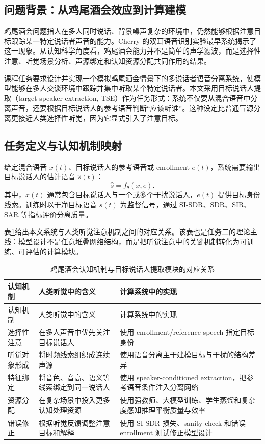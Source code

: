 \documentclass[UTF8,zihao=-4,a4paper]{ctexart}
\begin{document}
\subsection{问题背景：从鸡尾酒会效应到计算建模}

鸡尾酒会问题指人在多人同时说话、背景噪声复杂的环境中，仍然能够根据注意目标跟踪某一特定说话者声音的能力。Cherry 的双耳语音识别实验最早系统揭示了这一现象\cite{cherry1953}。从认知科学角度看，鸡尾酒会能力并不是简单的声学滤波，而是选择性注意、听觉场景分析、声源绑定和认知资源分配共同作用的结果\cite{broadbent1958,bregman1990}。

课程任务要求设计并实现一个模拟鸡尾酒会情景下的多说话者语音分离系统，使模型能够在多人交谈环境中跟踪并集中听取某个特定说话者。本文采用目标说话人提取（target speaker extraction, TSE）作为任务形式：系统不仅要从混合语音中分离声音，还要根据目标说话人的参考语音判断“应该听谁”。这种设定比普通盲源分离更接近人类选择性听觉，因为它显式引入了注意目标。

\subsection{任务定义与认知机制映射}

给定混合语音 $x(t)$、目标说话人的参考语音或 enrollment $e(t)$，系统需要输出目标说话人的估计语音 $\hat{s}(t)$：
\[
    \hat{s}=f_{\theta}(x,e).
\]
其中，$x(t)$ 通常包含目标说话人与一个或多个干扰说话人，$e(t)$ 提供目标身份线索。训练时以干净目标语音 $s(t)$ 为监督信号，通过 SI-SDR、SDR、SIR、SAR 等指标评价分离质量。

表\ref{tab:tse_cognitive_mapping}给出本文系统与人类听觉注意机制之间的对应关系。该表也是任务二的理论主线：模型设计不是任意堆叠网络结构，而是把听觉注意中的关键机制转化为可训练、可评估的计算模块。

\begin{longtable}{p{3.0cm}p{4.5cm}p{5.5cm}}
\caption{鸡尾酒会认知机制与目标说话人提取模块的对应关系}
\label{tab:tse_cognitive_mapping}\\
\toprule
认知机制 & 人类听觉中的含义 & 计算系统中的实现 \\
\midrule
\endfirsthead
\toprule
认知机制 & 人类听觉中的含义 & 计算系统中的实现 \\
\midrule
\endhead
选择性注意 & 在多人声音中优先关注目标说话人 & 使用 enrollment/reference speech 指定目标身份 \\
听觉对象形成 & 将时频线索组织成连续声源 & 使用语音分离主干建模目标与干扰的结构差异 \\
特征绑定 & 将音色、音高、语义等线索绑定到同一说话人 & 使用 speaker-conditioned extraction，把参考语音条件注入分离网络 \\
资源分配 & 在复杂场景中投入更多认知处理资源 & 使用强教师、大模型训练、学生蒸馏和复杂度感知推理平衡质量与效率 \\
错误修正 & 根据听觉反馈调整注意目标和解释 & 使用 SI-SDR 损失、sanity check 和错误 enrollment 测试修正模型设计 \\
\bottomrule
\end{longtable}
\end{document}
